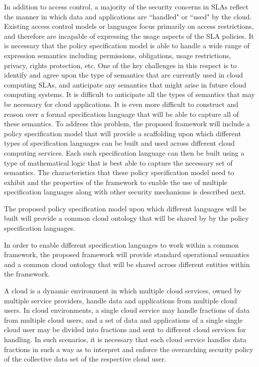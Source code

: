 \documentclass[10pt, conference, compsocconf]{IEEEtran}
\begin{document}
In addition to access control, a majority of the security concerns in SLAs reflect the manner in which data and applications are ``handled" or ``used" by the cloud.  Existing access control models or languages focus primarily on access restrictions, and therefore are incapable of expressing the usage aspects of the SLA policies. It is necessary that the policy specification model is able to handle a wide range of expression semantics including permissions, obligations, usage restrictions, privacy, rights protection, etc. One of the key challenges in this respect is to identify and agree upon the type of semantics that are currently used in cloud computing SLAs, and anticipate any semantics that might arise in future cloud computing systems. It is difficult to anticipate all the types of semantics that may be necessary for cloud applications. It is even more difficult to construct and reason over a formal specification language that will be able to capture all of these semantics. To address this problem, the proposed framework will include a policy specification model that will provide a scaffolding  upon which different types of specification languages can be built and used across different cloud computing services. Each such specification language can then be built using a type of mathematical logic that is best able to capture the necessary set of semantics. The characteristics that these policy specification model need to exhibit and the properties of the framework to enable the use of multiple specification languages along with other security mechanisms is described next. 

The proposed policy specification model upon which different languages will be built will provide a common cloud ontology that will be shared by by the policy specification languages.

In order to enable different specification languages to work within a common framework, the proposed framework will provide standard operational semantics and a common cloud ontology that will be shared across different entities within the framework. 

A cloud is a dynamic environment in which multiple cloud services, owned by multiple service providers, handle data and applications from multiple cloud users. In cloud environments, a single cloud service may handle fractions of data from multiple cloud users, and a set of data and applications of a single single cloud user may be divided into fractions and sent to different cloud services for handling. In such scenarios, it is necessary that each cloud service handles data fractions in such a way as to interpret and enforce the overarching security policy of the collective data set of the respective cloud user. 
\end{document}
